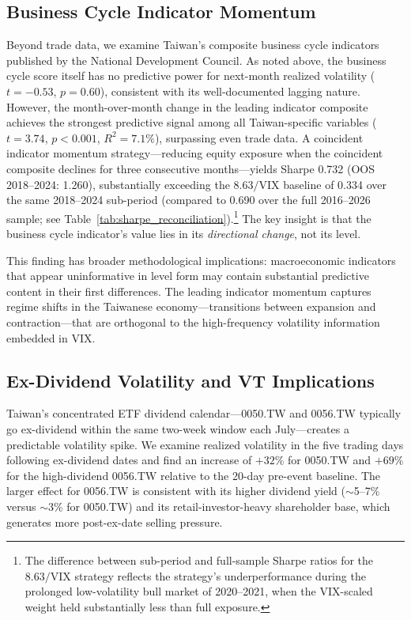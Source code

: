 \subsection{Business Cycle Indicator Momentum}
\label{sec:bci_mom}

Beyond trade data, we examine Taiwan's composite business cycle indicators published by the National Development Council. As noted above, the business cycle score itself has no predictive power for next-month realized volatility ($t = -0.53$, $p = 0.60$), consistent with its well-documented lagging nature. However, the month-over-month change in the leading indicator composite achieves the strongest predictive signal among all Taiwan-specific variables ($t = 3.74$, $p < 0.001$, $R^2 = 7.1\%$), surpassing even trade data. A coincident indicator momentum strategy---reducing equity exposure when the coincident composite declines for three consecutive months---yields Sharpe 0.732 (OOS 2018--2024: 1.260), substantially exceeding the $8.63/\text{VIX}$ baseline of 0.334 over the same 2018--2024 sub-period (compared to 0.690 over the full 2016--2026 sample; see Table~\ref{tab:sharpe_reconciliation}).\footnote{The difference between sub-period and full-sample Sharpe ratios for the $8.63/\text{VIX}$ strategy reflects the strategy's underperformance during the prolonged low-volatility bull market of 2020--2021, when the VIX-scaled weight held substantially less than full exposure.} The key insight is that the business cycle indicator's value lies in its \textit{directional change}, not its level.

This finding has broader methodological implications: macroeconomic indicators that appear uninformative in level form may contain substantial predictive content in their first differences. The leading indicator momentum captures regime shifts in the Taiwanese economy---transitions between expansion and contraction---that are orthogonal to the high-frequency volatility information embedded in VIX.

\subsection{Ex-Dividend Volatility and VT Implications}
\label{sec:exdiv}

Taiwan's concentrated ETF dividend calendar---0050.TW and 0056.TW typically go ex-dividend within the same two-week window each July---creates a predictable volatility spike. We examine realized volatility in the five trading days following ex-dividend dates and find an increase of $+32\%$ for 0050.TW and $+69\%$ for the high-dividend 0056.TW relative to the 20-day pre-event baseline. The larger effect for 0056.TW is consistent with its higher dividend yield ($\sim$5--7\% versus $\sim$3\% for 0050.TW) and its retail-investor-heavy shareholder base, which generates more post-ex-date selling pressure.

